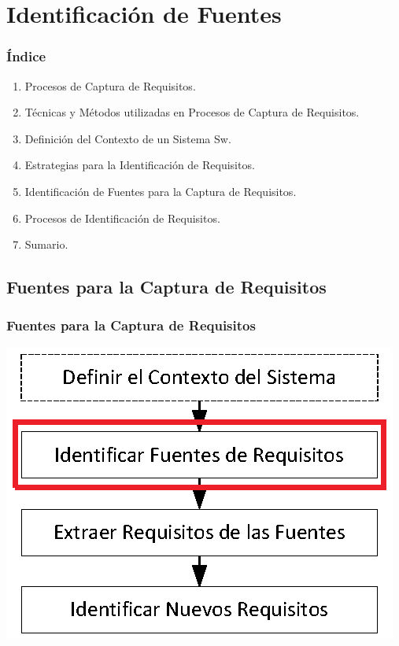 ﻿\documentclass[handout,a4paper,slidestop,xcolor=pst,dvips,blue]{beamer}
\begin{document}
\section{Identificación de Fuentes}

\begin{frame}[c]
    \frametitle{Índice}
    \begin{enumerate}
         \item Procesos de Captura de Requisitos.
         \item Técnicas y Métodos utilizadas en Procesos de Captura de Requisitos.
         \item Definición del Contexto de un Sistema Sw.
         \item Estrategias para la Identificación de Requisitos.
         \item \alert{Identificación de Fuentes para la Captura de Requisitos}.
         \item Procesos de Identificación de Requisitos.
         \item Sumario.
    \end{enumerate}
\end{frame}

\subsection{Fuentes para la Captura de Requisitos}

\begin{frame}[c]
    \frametitle{Fuentes para la Captura de Requisitos}
    \begin{center}
        \includegraphics[width=0.75\linewidth]{images/proceso/fuentes.eps}
    \end{center}
\end{frame}
\end{document}
